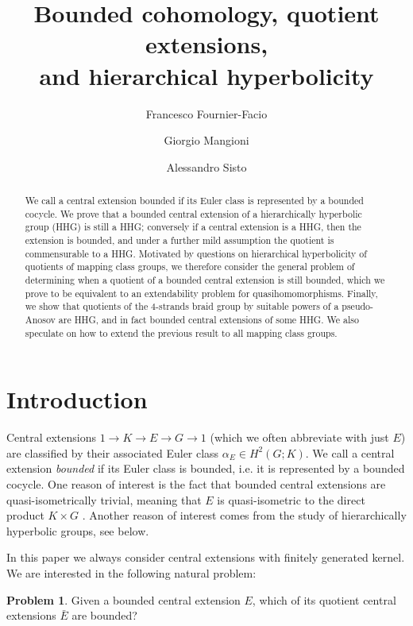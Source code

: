 \documentclass[svgnames]{amsart}
\title[Bounded cohomology, quotient extensions, and HHG]{Bounded cohomology, quotient extensions,\\and hierarchical hyperbolicity}
\author[F. Fournier-Facio]{Francesco Fournier-Facio}
\author[G. Mangioni]{Giorgio Mangioni}
\author[A. Sisto]{Alessandro Sisto}
\theoremstyle{plain}
\theoremstyle{definition}
\newtheorem{problem}[thm]{Problem}
\begin{document}
\begin{abstract}
    We call a central extension bounded if its Euler class is represented by a bounded cocycle. We prove that a bounded central extension of a hierarchically hyperbolic group (HHG) is still a HHG; conversely if a central extension is a HHG, then the extension is bounded, and under a further mild assumption the quotient is commensurable to a HHG. Motivated by questions on hierarchical hyperbolicity of quotients of mapping class groups, we therefore consider the general problem of determining when a quotient of a bounded central extension is still bounded, which we prove to be equivalent to an extendability problem for quasihomomorphisms. Finally, we show that quotients of the 4-strands braid group by suitable powers of a pseudo-Anosov are HHG, and in fact bounded central extensions of some HHG. We also speculate on how to extend the previous result to all mapping class groups.
\end{abstract}
\maketitle


\section{Introduction}
Central extensions $1\to K\to E\to G\to 1$ (which we often abbreviate with just $E$) are classified by their associated Euler class $\alpha_E\in H^2(G; K)$. We call a central extension \emph{bounded} if its Euler class is bounded, i.e. it is represented by a bounded cocycle. One reason of interest is the fact that bounded central extensions are quasi-isometrically trivial, meaning that $E$ is quasi-isometric to the direct product $K\times G$ \cite{Gersten_B_is_QIT}. Another reason of interest comes from the study of hierarchically hyperbolic groups, see below.

In this paper we always consider central extensions with finitely generated kernel. We are interested in the following natural problem:

\begin{problem}
\label{prob}
    Given a bounded central extension $E$, which of its quotient central extensions $\bar E$ are bounded?
\end{problem}
\end{document}
